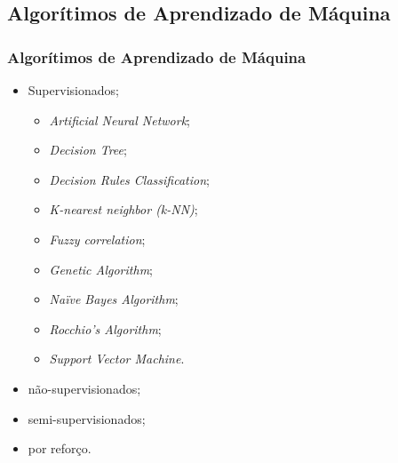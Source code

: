 \documentclass{beamer}
\begin{document}
\subsection{Algorítimos de Aprendizado de Máquina}
\begin{frame}
\frametitle {Algorítimos de Aprendizado de Máquina}
\begin{itemize}
\item Supervisionados;
\begin{itemize}
\item \textit{Artificial Neural Network};
\item \textit{Decision Tree};
\item \textit{Decision Rules Classification};
\item \textit{K-nearest neighbor (k-NN)};
\item \textit{Fuzzy correlation};
\item \textit{Genetic Algorithm};
\item \textit{Naïve Bayes Algorithm};
\item \textit{Rocchio's Algorithm};
\item \textit{Support Vector Machine}.
\end{itemize}
\item não-supervisionados;
\item semi-supervisionados;
\item por reforço.
\end{itemize}
\end{frame}
\end{document}
